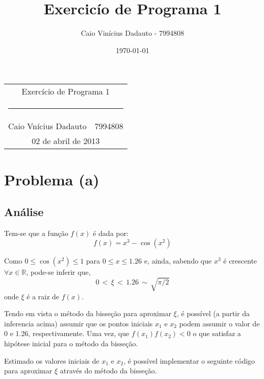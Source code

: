 \documentclass[a4paper,11pt, twoside]{article}
\date{\today}
\author{Caio Vinícius Dadauto - 7994808}
\title{Exercicío de Programa 1}
\begin{document}
    \pagestyle{fancy}
    \fancyhf{}
    \renewcommand{\footrulewidth}{0.1pt}
    \renewcommand{\headrulewidth}{0.0pt}
    \fancyfoot[LE, RO]{\bfseries \thepage}

    \begin{center}
        \begin{tabular}{c}
            {\huge Exercício de Programa 1}\\[-0.5cm]
            \rule{0.6\textwidth}{0.1mm}\\
            Caio Vnícius Dadauto$\quad$7994808\\
            {\small 02 de abril de 2013}
        \end{tabular}
    \end{center}
    \vspace{2cm}

    \section*{Problema (a)}
    \subsection*{Análise}
    Tem-se que a função $f(x)$ é dada por:
    \begin{equation}
        f(x) = x^3 - \cos(x^2)
    \end{equation}
    
    Como $0\le \cos (x^2) \le 1$ para $0\leq x\le 1.26$ e, ainda, sabendo que $x^3$ é crescente $\forall x \in\mathbb{R}$,
    pode-se inferir que,
    \begin{equation*}
        0\,<\,\xi\,<\,1.26\,\sim\,\sqrt{\pi / 2}
    \end{equation*}
    onde $\xi$ é a raiz de $f(x)$.
    
    Tendo em vista o método da bisseção para aproximar $\xi$, é possível (a partir da inferencia acima)
    assumir que os pontos iniciais $x_1$ e $x_2$ podem assumir o valor de 0 e 1.26, respectivamente.
    Uma vez, que $f(x_1)f(x_2)<0$ o que satisfaz a hipótese inicial para o método da bisseção.
    
    Estimado os valores iniciais de $x_1$ e $x_2$, é possível implementar o seguinte código para
    aproximar $\xi$ através do método da bisseção.\\[0.15cm]
    {\linespread{1.15}
    }
    
\end{document}
